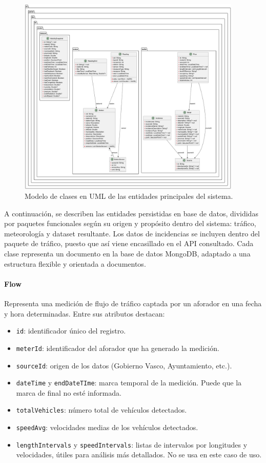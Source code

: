 \begin{figure}[H]
	\centering
	\includegraphics[width=0.95\textwidth]{includes/model_classes.png}
	\caption{Modelo de clases en UML de las entidades principales del sistema.}
	\label{fig:uml_classes}
\end{figure}

A continuación, se describen las entidades persistidas en base de datos, divididas por paquetes funcionales según su origen y propósito dentro del sistema: tráfico, meteorología y dataset resultante. Los datos de incidencias se incluyen dentro del paquete de tráfico, puesto que así viene encasillado en el API consultado. Cada clase representa un documento en la base de datos MongoDB, adaptado a una estructura flexible y orientada a documentos.

\paragraph*{Flow}
Representa una medición de flujo de tráfico captada por un aforador en una fecha y hora determinadas. Entre sus atributos destacan:
\begin{itemize}
	\item \texttt{id}: identificador único del registro.
	\item \texttt{meterId}: identificador del aforador que ha generado la medición.
	\item \texttt{sourceId}: origen de los datos (Gobierno Vasco, Ayuntamiento, etc.).
	\item \texttt{dateTime} y \texttt{endDateTIme}: marca temporal de la medición. Puede que la marca de final no esté informada.
	\item \texttt{totalVehicles}: número total de vehículos detectados.
	\item \texttt{speedAvg}: velocidades medias de los vehículos detectados.
	\item \texttt{lengthIntervals} y \texttt{speedIntervals}: listas de intervalos por longitudes y velocidades, útiles para análisis más detallados. No se usa en este caso de uso.
\end{itemize}


